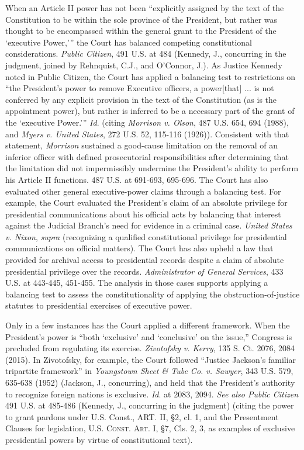 When an Article II power has not been “explicitly assigned by the text of the Constitution to be within the sole province of the President, but rather was thought to be encompassed within the general grant to the President of the ‘executive Power,’” the Court has balanced competing constitutional considerations.
\textit{Public Citizen}, 491 U.S. at 484 (Kennedy, J., concurring in the judgment, joined by Rehnquist, C.J., and O’Connor, J.).
As Justice Kennedy noted in Public Citizen, the Court has applied a balancing test to restrictions on “the President’s power to remove Executive officers, a power[that] ... is not conferred by any explicit provision in the text of the Constitution (as is the appointment power), but rather is inferred to be a necessary part of the grant of the ‘executive Power.’”
\textit{Id}. (citing \textit{Morrison v. Olson}, 487 U.S. 654, 694 (1988), and \textit{Myers v. United States}, 272 U.S. 52, 115-116 (1926)).
Consistent with that statement, \textit{Morrison} sustained a good-cause limitation on the removal of an inferior officer with defined prosecutorial responsibilities after determining that the limitation did not impermissibly undermine the President’s ability to perform his Article II functions.
487 U.S. at 691-693, 695-696.
The Court has also evaluated other general executive-power claims through a balancing test.
For example, the Court evaluated the President’s claim of an absolute privilege for presidential communications about his official acts by balancing that interest against the Judicial Branch’s need for evidence in a criminal case.
\textit{United States v. Nixon}, \textit{supra} (recognizing a qualified constitutional privilege for presidential communications on official matters).
The Court has also upheld a law that provided for archival access to presidential records despite a claim of absolute presidential privilege over the records.
\textit{Administrator of General Services}, 433 U.S. at 443-445, 451-455.
The analysis in those cases supports applying a balancing test to assess the constitutionality of applying the obstruction-of-justice statutes to presidential exercises of executive power.

Only in a few instances has the Court applied a different framework.
When the President’s power is “both ‘exclusive’ and ‘conclusive’ on the issue,” Congress is precluded from regulating its exercise.
\textit{Zivotofsky v. Kerry}, 135 S. Ct. 2076, 2084 (2015).
In Zivotofsky, for example, the Court followed “Justice Jackson’s familiar tripartite framework” in \textit{Youngstown Sheet \& Tube Co. v. Sawyer}, 343 U.S. 579, 635-638 (1952) (Jackson, J., concurring), and held that the President’s authority to recognize foreign nations is exclusive.
\textit{Id}. at 2083, 2094.
\textit{See also Public Citizen} 491 U.S. at 485-486 (Kennedy, J., concurring in the judgment) (citing the power to grant pardons under U.S. Const., ART. II, \S 2, cl. 1, and the Presentment Clauses for legislation, \textsc{U.S. Const. Art. I}, \S 7, Cls. 2, 3, as examples of exclusive presidential powers by virtue of constitutional text).

